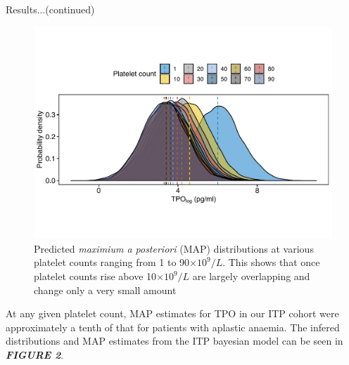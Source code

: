 \documentclass[landscape,a0paper,fontscale=0.285]{beamer} %
\newlength{\onecolwid}
\newlength{\twocolwid}
\begin{document}
\begin{frame}[t]
\begin{columns}[t]
\begin{column}{\twocolwid}
\begin{columns}[t,totalwidth=\twocolwid]
\begin{column}{\onecolwid}
\begin{block}{Results...(continued)}
\begin{figure}[H]
\includegraphics[width=0.8\linewidth]{fig/Probability_density.pdf}
\caption{Predicted \textit{maximium a posteriori} (MAP) distributions at various platelet counts ranging from 1 to 90$\times 10^9/L$. This shows that once platelet counts rise above 10$\times 10^9/L$ are largely overlapping and change only a very small amount}
\end{figure}
At any given platelet count, MAP estimates for TPO in our ITP cohort were approximately a tenth of that for patients with aplastic anaemia. The infered distributions and MAP estimates from the ITP bayesian model can be seen in \textbf{\emph{FIGURE 2}}.









\end{block}
\end{column}
\end{columns}
\end{column}
\end{columns}
\end{frame}
\end{document}
